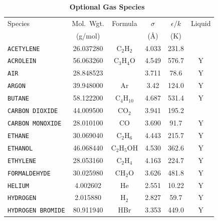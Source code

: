 \documentclass[11pt]{book}
\newcommand{\ct}{\tt\small}
\begin{document}
\begin{table}[ht]
\begin{center}
\caption[Optional Gas Species]{\bf Optional Gas Species~\cite{Reid:1}}
\label{tab:gasspecies}
\vspace{0.1in}
\begin{tabular}{|l|c|c|c|c|c|}
\hline
Species &   Mol.~Wgt.           & Formula          & $\sigma$ & $\epsilon/k$   & Liquid \\
        &   (g/mol)             &                  & (\AA)    & (K)            &        \\ \hline
\hline
{\ct ACETYLENE}          & 26.037280 & C$_2$H$_2$       & 4.033    & 231.8           &        \\ \hline
{\ct ACROLEIN}           & 56.063260 & C$_3$H$_4$O      & 4.549    & 576.7           &    Y   \\ \hline
{\ct AIR}                & 28.848523 &                  & 3.711    & 78.6            &    Y   \\ \hline
{\ct ARGON}              & 39.948000 & Ar               & 3.42     & 124.0           &    Y   \\ \hline
{\ct BUTANE}             & 58.122200 & C$_4$H$_{10}$    & 4.687    & 531.4           &    Y   \\ \hline
{\ct CARBON DIOXIDE}     & 44.009500 & CO$_2$           & 3.941    & 195.2           &        \\ \hline
{\ct CARBON MONOXIDE}    & 28.010100 & CO               & 3.690    & 91.7            &    Y   \\ \hline
{\ct ETHANE}             & 30.069040 & C$_2$H$_6$       & 4.443    & 215.7           &    Y   \\ \hline
{\ct ETHANOL}            & 46.068440 & C$_2$H$_5$OH     & 4.530    & 362.6           &    Y   \\ \hline
{\ct ETHYLENE}           & 28.053160 & C$_2$H$_4$       & 4.163    & 224.7           &    Y   \\ \hline
{\ct FORMALDEHYDE}       & 30.025980 & CH$_2$O          & 3.626    & 481.8           &    Y   \\ \hline
{\ct HELIUM}             & 4.002602  & He               & 2.551    & 10.22           &    Y   \\ \hline
{\ct HYDROGEN}           & 2.015880  & H$_2$            & 2.827    & 59.7            &    Y   \\ \hline
{\ct HYDROGEN BROMIDE}   & 80.911940 & HBr              & 3.353    & 449.0           &    Y   \\ \hline

\end{tabular}
\end{center}
\end{table}
\end{document}
